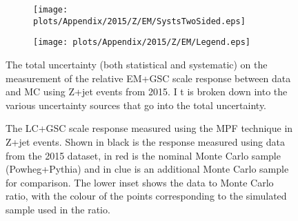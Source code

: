 \begin{figure}[!ht]
\captionsetup[subfigure]{labelformat=empty}
 \begin{center}
   \begin{subfigure}{0.55\textwidth}
     \hspace{-3cm}
     \texttt{[image: plots/Appendix/2015/Z/EM/SystsTwoSided.eps]}
   \end{subfigure}
   \begin{subfigure}{0.55\textwidth}
     \hspace{-3cm}
     \texttt{[image: plots/Appendix/2015/Z/EM/Legend.eps]}
   \end{subfigure}
 \end{center}
 \caption[Uncertainty on the EM+GSC scale response measurement using Z+jet]
 {\small The total uncertainty (both statistical and systematic) on the measurement of the relative EM+GSC scale response between data and MC using Z+jet events from 2015.  I
t is broken down into the various uncertainty sources that go into the total uncertainty.  }
 \label{Fig:ZJetSystsEM2015}
\end{figure}


\begin{figure}[!ht]
  \begin{center}
  \end{center}
  \caption[LC scale response using Z+jet in 2015]
  {\small The LC+GSC scale response measured using the MPF technique in Z+jet events.  Shown in black is the response measured using data from the 2015 dataset, in red is the nominal Monte Carlo sample (Powheg+Pythia) and in clue is an additional Monte Carlo sample for comparison.  The lower inset shows the data to Monte Carlo ratio, with the colour of the points corresponding to the simulated sample used in the ratio.  }
  \label{plot:ZJetLC2015App}
\end{figure}


